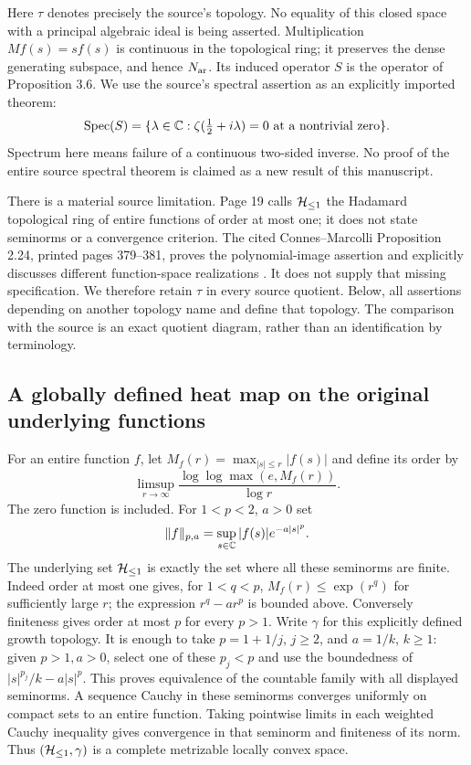 Here $\tau$ denotes precisely the source's topology. No equality of
this closed space with a principal algebraic ideal is being asserted.
Multiplication $M f(s)=sf(s)$ is continuous in the topological ring;
it preserves the dense generating subspace, and hence $N_{\rm ar}$.
Its induced operator $S$ is the operator of Proposition 3.6.
We use the source's spectral assertion as an explicitly imported theorem:
\begin{equation}\label{eq:cq-source-spectrum}
 \operatorname{Spec}(S)=\{\lambda\in\mathbb C:
             \zeta(\tfrac12+i\lambda)=0
             \text{ at a nontrivial zero}\}.
\end{equation}
Spectrum here means failure of a continuous two-sided inverse.
No proof of the entire source spectral theorem is claimed as a new
result of this manuscript.

There is a material source limitation. Page 19 calls $\mathcal H_{\leq 1}$ the
Hadamard topological ring of entire functions of order at most one;
it does not state seminorms or a convergence criterion. The cited
Connes--Marcolli Proposition 2.24, printed pages 379--381,
proves the polynomial-image assertion and explicitly discusses
different function-space realizations \cite{connesMarcolli2008}. It does not supply
that missing specification. We therefore retain $\tau$ in every
source quotient. Below, all assertions depending on another topology
name and define that topology. The comparison with the source is an
exact quotient diagram, rather than an identification by terminology.

\subsection{A globally defined heat map on the original underlying functions}
\label{sec:cq-heatspace}
For an entire function $f$, let
$M_f(r)=\max_{|s|\leq r}|f(s)|$ and define its order by
\[
 \limsup_{r\to\infty}
       \frac{\log\log\max(e,M_f(r))}{\log r}.
\]
The zero function is included. For $1<p<2$, $a>0$ set
\[
 \|f\|_{p,a}=\sup_{s\in\mathbb C}|f(s)|e^{-a|s|^p}.
\]
The underlying set $\mathcal H_{\leq 1}$ is exactly the set where all these seminorms
are finite. Indeed order at most one gives, for $1<q<p$,
$M_f(r)\leq\exp(r^q)$ for sufficiently large $r$; the expression
$r^q-ar^p$ is bounded above. Conversely finiteness gives order at
most $p$ for every $p>1$.
Write $\gamma$ for this explicitly defined growth topology.
It is enough to take $p=1+1/j$, $j\geq2$, and $a=1/k$, $k\geq1$:
given $p>1,a>0$, select one of these $p_j<p$ and use the boundedness
of $|s|^{p_j}/k-a|s|^p$. This proves equivalence of the countable
family with all displayed seminorms. A sequence Cauchy in these
seminorms converges uniformly on compact sets to an entire function.
Taking pointwise limits in each weighted Cauchy inequality gives
convergence in that seminorm and finiteness of its norm. Thus
$(\mathcal H_{\leq 1},\gamma)$ is a complete metrizable locally convex space.

